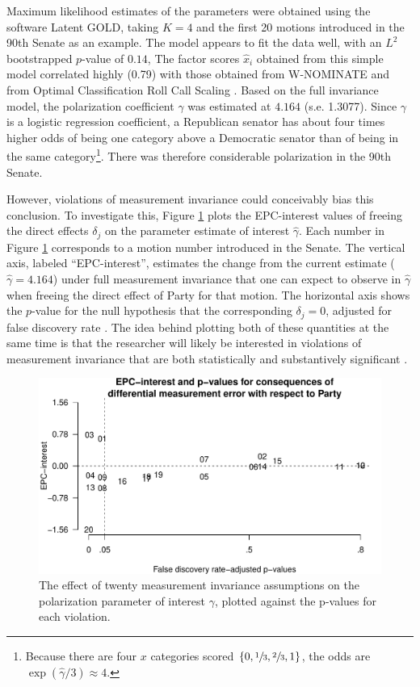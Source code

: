 \documentclass[letterpaper,12pt]{article}
\begin{document}
Maximum likelihood estimates of the parameters were obtained using the software Latent GOLD, taking $K=4$ and the first 20 motions introduced in the 90th Senate as an example. The model appears to fit the data well, with an $L^2$ bootstrapped $p$-value of $0.14$, The factor scores $\hat{x}_i$ obtained from this simple model correlated highly (0.79) with those obtained from W-NOMINATE \citep{poole2008scaling} and from Optimal Classification Roll Call Scaling \citep[0.81;][]{poole2012oc}. Based on the full invariance model, the polarization coefficient $\hat{\gamma}$ was estimated at $4.164$ (s.e. 1.3077). Since $\gamma$ is a logistic regression coefficient,  a Republican senator has about four times higher odds of being one category above a Democratic senator than of being in the same category\footnote{Because there are four $x$ categories scored $\{0, \sfrac{1}{3}, \sfrac{2}{3}, 1\}$, the odds are $\exp(\hat{\gamma}/3)\approx4$.}. There was therefore considerable polarization in the 90th Senate. 

However, violations of measurement invariance could conceivably bias this conclusion. To investigate this, Figure \ref{fig:epc-interest} plots the EPC-interest values of freeing the direct effects $\delta_j$ on the parameter estimate of interest $\hat{\gamma}$. Each number in Figure \ref{fig:epc-interest} corresponds to a motion number introduced in the Senate. The vertical axis, labeled ``EPC-interest'', estimates the change from the current estimate ($\hat{\gamma}=4.164$) under full measurement invariance that one can expect to observe in $\hat{\gamma}$ when freeing the direct effect of Party for that motion. 
The horizontal axis shows the $p$-value for the null hypothesis that the corresponding $\delta_j = 0$, adjusted for false discovery rate \citep{benjamini1995controlling}. The idea behind plotting both of these quantities at the same time is that the researcher will likely be interested in violations of measurement invariance that are both statistically and substantively significant \citep{saris2009testing}.

\begin{figure}\centering
\includegraphics[width=.8\textwidth]{epc-interest.pdf}
\caption{The effect of twenty measurement invariance assumptions on the polarization parameter of interest $\gamma$, plotted against the p-values for each violation.}
\label{fig:epc-interest}
\end{figure}
\end{document}
